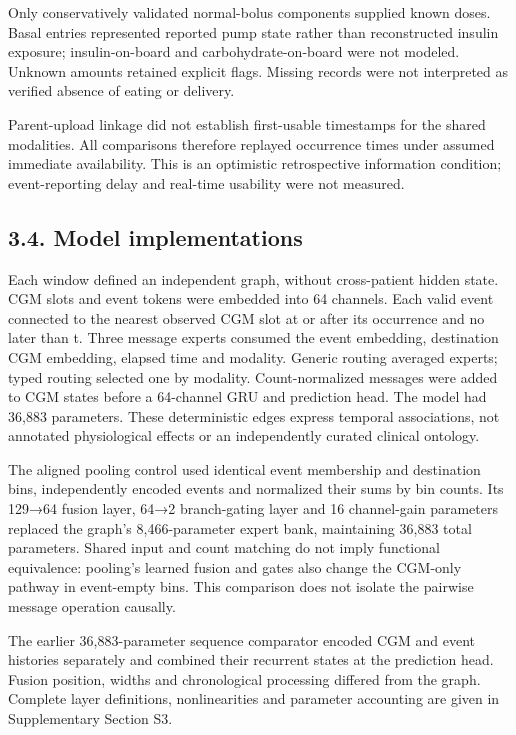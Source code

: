 \documentclass[11pt,a4paper]{article}
\begin{document}
Only conservatively validated normal-bolus components supplied known doses. Basal entries represented reported pump state rather than reconstructed insulin exposure; insulin-on-board and carbohydrate-on-board were not modeled. Unknown amounts retained explicit flags. Missing records were not interpreted as verified absence of eating or delivery.

Parent-upload linkage did not establish first-usable timestamps for the shared modalities. All comparisons therefore replayed occurrence times under assumed immediate availability. This is an optimistic retrospective information condition; event-reporting delay and real-time usability were not measured.

\subsection*{3.4. Model implementations}
Each window defined an independent graph, without cross-patient hidden state. CGM slots and event tokens were embedded into 64 channels. Each valid event connected to the nearest observed CGM slot at or after its occurrence and no later than t. Three message experts consumed the event embedding, destination CGM embedding, elapsed time and modality. Generic routing averaged experts; typed routing selected one by modality. Count-normalized messages were added to CGM states before a 64-channel GRU and prediction head. The model had 36,883 parameters. These deterministic edges express temporal associations, not annotated physiological effects or an independently curated clinical ontology.

The aligned pooling control used identical event membership and destination bins, independently encoded events and normalized their sums by bin counts. Its 129→64 fusion layer, 64→2 branch-gating layer and 16 channel-gain parameters replaced the graph's 8,466-parameter expert bank, maintaining 36,883 total parameters. Shared input and count matching do not imply functional equivalence: pooling's learned fusion and gates also change the CGM-only pathway in event-empty bins. This comparison does not isolate the pairwise message operation causally.

The earlier 36,883-parameter sequence comparator encoded CGM and event histories separately and combined their recurrent states at the prediction head. Fusion position, widths and chronological processing differed from the graph. Complete layer definitions, nonlinearities and parameter accounting are given in Supplementary Section S3.
\end{document}
